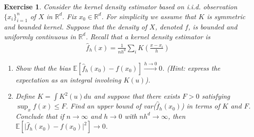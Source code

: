 \documentclass[12pt]{article}
\theoremstyle{colon}
\newtheorem{exercise}{Exercise}
\begin{document}
\begin{exercise}
  Consider the kernel density estimator based on i.i.d. observation $\{ x_i \}_{i=1}^n$ of $X$ in $\mathbb{R}^d$. Fix $x_0 \in \mathbb{R}^d$. For simplicity we assume that $K$ is symmetric and bounded kernel. Suppose that the density of $X$, denoted $f$, is bounded and uniformly continuous in $\mathbb{R}^d$. Recall that a kernel density estimator is
  \begin{gather*}
    \widehat{f}_h(x) = \frac{1}{n h^d} \sum_i K \left( \frac{x - x_i}{h} \right)
  \end{gather*}
  \begin{enumerate}[label=\arabic*)]
    \item Show that the bias $\mathbb{E}[\widehat{f}_h(x_0) - f(x_0)] \xrightarrow{h \rightarrow 0} 0$. (Hint: express the expectation as an integral involving $K(u)$).
    \item Define $K = \int K^2(u) du$ and suppose that there exists $F > 0$ satisfying $\sup_x f(x) \leq F$. Find an upper bound of var($\widehat{f}_h(x_0)$) in terms of $K$ and $F$.  Conclude that if $n \rightarrow \infty$ and $h \rightarrow 0$ with $n h^d \rightarrow \infty$, then $\mathbb{E}[\lvert \widehat{f}_h(x_0) - f(x_0) \rvert^2] \rightarrow 0$.
  \end{enumerate}
\end{exercise}
\end{document}
